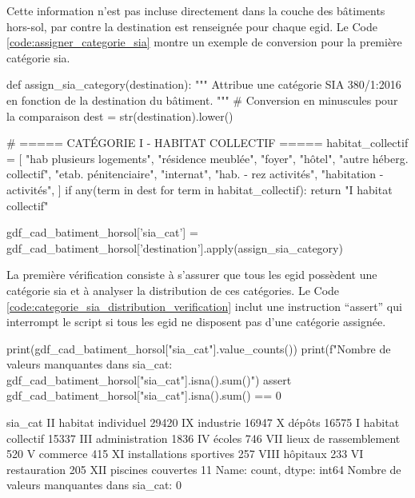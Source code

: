 \newpage
Cette information n'est pas incluse directement dans la couche des bâtiments hors-sol, par contre la destination est renseignée pour chaque \gls{egid}. Le Code \ref{code:assigner_categorie_sia} montre un exemple de conversion pour la première catégorie \gls{sia}.

\vspace{0.35cm}
\begin{pythoncode}
def assign_sia_category(destination):
    """
    Attribue une catégorie SIA 380/1:2016 en fonction de la destination du bâtiment.
    """
    # Conversion en minuscules pour la comparaison
    dest = str(destination).lower()

    # ===== CATÉGORIE I - HABITAT COLLECTIF =====
    habitat_collectif = [
        "hab plusieurs logements",
        "résidence meublée",
        "foyer",
        "hôtel",
        "autre héberg. collectif",
        "etab. pénitenciaire",
        "internat",
        "hab. - rez activités",
        "habitation - activités",
    ]
    if any(term in dest for term in habitat_collectif):
        return "I habitat collectif"

gdf_cad_batiment_horsol['sia_cat'] = gdf_cad_batiment_horsol['destination'].apply(assign_sia_category)
\end{pythoncode}
\label{code:assigner_categorie_sia}

La première vérification consiste à s'assurer que tous les \gls{egid} possèdent une catégorie \gls{sia} et à analyser la distribution de ces catégories. Le Code \ref{code:categorie_sia_distribution_verification} inclut une instruction ``assert'' qui interrompt le script si tous les \gls{egid} ne disposent pas d'une catégorie assignée.

\vspace{0.35cm}
\begin{pythoncode}
print(gdf_cad_batiment_horsol["sia_cat"].value_counts())
print(f"Nombre de valeurs manquantes dans sia_cat: {gdf_cad_batiment_horsol["sia_cat"].isna().sum()}")
assert gdf_cad_batiment_horsol["sia_cat"].isna().sum() == 0
\end{pythoncode}
\vspace{0.35cm}
\begin{textcode}
sia_cat
II habitat individuel         29420
IX industrie                  16947
X dépôts                      16575
I habitat collectif           15337
III administration             1836
IV écoles                       746
VII lieux de rassemblement      520
V commerce                      415
XI installations sportives      257
VIII hôpitaux                   233
VI restauration                 205
XII piscines couvertes           11
Name: count, dtype: int64
Nombre de valeurs manquantes dans sia_cat: 0
\end{textcode}
\label{code:categorie_sia_distribution_verification}

